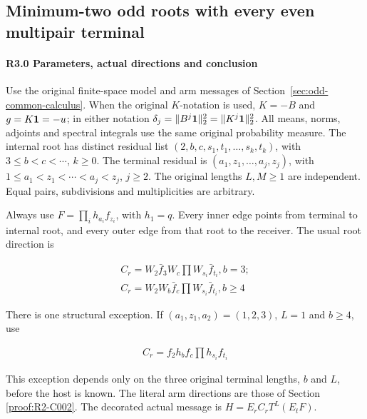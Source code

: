 \subsection{Minimum-two odd roots with every even multipair terminal}\label{proof:R2-C003}
\paragraph{R3.0 Parameters, actual directions and conclusion}

Use the original finite-space model and arm messages of
Section~\ref{sec:odd-common-calculus}.
When the original \(K\)-notation is used, \(K=-B\) and
\(g=K\mathbf1=-u\); in either notation
\(\delta_j=\|B^j\mathbf1\|_2^2=\|K^j\mathbf1\|_2^2\).
All means, norms, adjoints and spectral integrals use the same
original probability measure.
The internal root has distinct residual list \((2,\allowbreak \allowbreak  b,\allowbreak \allowbreak  c,\allowbreak \allowbreak  s_1,\allowbreak \allowbreak  t_1,\allowbreak \allowbreak  \ldots,\allowbreak \allowbreak  s_k,\allowbreak \allowbreak  t_k)\), with \(3\le b<c<\cdots\), \(k\ge0\). The terminal residual is \((a_1,\allowbreak \allowbreak  z_1,\allowbreak \allowbreak  \ldots,\allowbreak \allowbreak  a_j,\allowbreak \allowbreak  z_j)\), with \(1\le a_1<z_1<\cdots<a_j<z_j\), \(j\ge2\). The original lengths \(L,\allowbreak \allowbreak  M\ge1\) are independent. Equal pairs, subdivisions and multiplicities are arbitrary.

Always use \(F=\prod_i h_{a_i}f_{z_i}\), with \(h_1=q\). Every inner edge points from terminal to internal root, and every outer edge from that root to the receiver. The usual root direction is

\[
\begin{gathered}
C_r=W_2 \bar f_3 W_c \prod W_{s_i}\bar f_{t_i},b=3;\\
C_r=W_2 W_b \bar f_c \prod W_{s_i}\bar f_{t_i},b\ge 4
\end{gathered}
\]

There is one structural exception. If \((a_1,\allowbreak \allowbreak  z_1,\allowbreak \allowbreak  a_2)=(1,\allowbreak \allowbreak  2,\allowbreak \allowbreak  3)\), \(L=1\) and \(b\ge4\), use

\[
\begin{gathered}
C_r=f_2 h_b f_c \prod h_{s_i}f_{t_i} 
\end{gathered}\tag{R3.0.1}
\]

This exception depends only on the three original terminal lengths, \(b\) and \(L\), before the host is known. The literal arm directions are those of Section \ref{proof:R2-C002}. The decorated actual message is \(H=E_rC_rT^L(E_tF)\).

